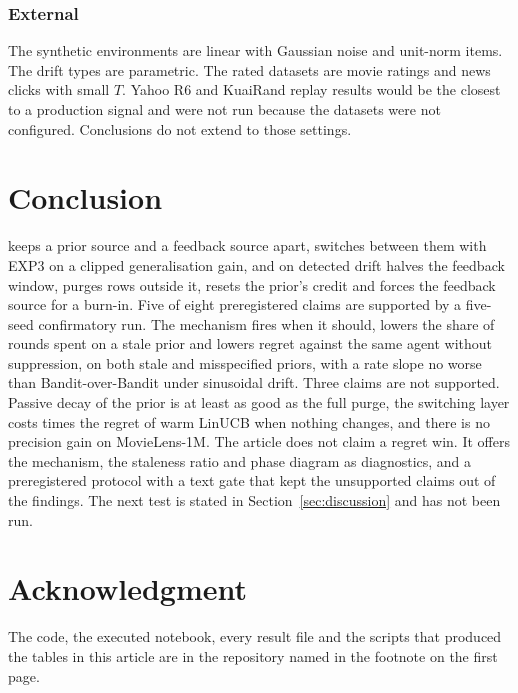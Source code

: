 \subsubsection*{External}
The synthetic environments are linear with Gaussian noise and unit-norm items. The drift types are parametric. The rated datasets are movie ratings and news clicks with small $T$. Yahoo R6 and KuaiRand replay results would be the closest to a production signal and were not run because the datasets were not configured. Conclusions do not extend to those settings.

\section{Conclusion}
\label{sec:conclusion}
\des{} keeps a prior source and a feedback source apart, switches between them with EXP3 on a clipped generalisation gain, and on detected drift halves the feedback window, purges rows outside it, resets the prior's credit and forces the feedback source for a burn-in. Five of eight preregistered claims are supported by a five-seed confirmatory run. The mechanism fires when it should, lowers the share of rounds spent on a stale prior and lowers regret against the same agent without suppression, on both stale and misspecified priors, with a rate slope no worse than Bandit-over-Bandit under sinusoidal drift. Three claims are not supported. Passive decay of the prior is at least as good as the full purge, the switching layer costs \harmRatio{} times the regret of warm LinUCB when nothing changes, and there is no precision gain on MovieLens-1M. The article does not claim a regret win. It offers the mechanism, the staleness ratio and phase diagram as diagnostics, and a preregistered protocol with a text gate that kept the unsupported claims out of the findings. The next test is stated in Section~\ref{sec:discussion} and has not been run.

\section*{Acknowledgment}
The code, the executed notebook, every result file and the scripts that produced the tables in this article are in the repository named in the footnote on the first page.



